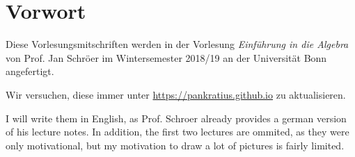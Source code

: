 \chapter*{Vorwort}
Diese Vorlesungsmitschriften werden in der Vorlesung \textit{Einführung in die Algebra} von Prof. Jan Schröer im Wintersemester 2018/19 an der Universität Bonn angefertigt.\par
Wir versuchen, diese immer unter \url{https://pankratius.github.io} zu aktualisieren.

I will write them in English, as Prof. Schroer already provides a german version of his lecture notes. In addition, the first two lectures are ommited, as they were only motivational, but my motivation to draw a lot of pictures is fairly limited.
